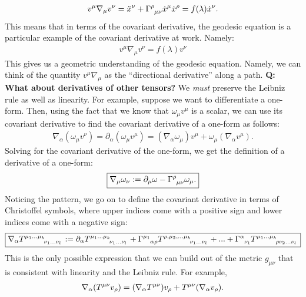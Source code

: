 \documentclass[11pt]{article}
\newcommand{\grmetric}[0]{g_{\mu \nu}}
\newcommand{\christoffel}[0]{\tensor{\Gamma}{^\rho_{\mu \nu}}}
\theoremstyle{definition}
\begin{document}
\begin{align*}
	v^\mu \nabla_\mu v^\nu = \ddot{x}^\nu + \christoffel \dot{x}^\mu \dot{x}^\rho = f (\lambda) \dot{x}^\nu. 
\end{align*}
This means that in terms of the covariant derivative, the geodesic equation is a particular example of the covariant derivative at work. Namely: 
\begin{align}\label{gechrist} 
	\boxed{v^\mu \nabla_\mu v^\nu = f(\lambda)v^\nu}
\end{align}
This gives us a geometric understanding of the geodesic equation. Namely, we can think of the quantity \( v^\mu \nabla_\mu \) as the ``directional derivative'' along a path. 
\newline
\newline
\textbf{Q: What about derivatives of other tensors?}
\newline
We \emph{must} preserve the Leibniz rule as well as linearity. For example, suppose we want to differentiate a one-form. Then,  using the fact that we know that \( \omega_\mu v^\mu \) is a scalar, we can use its covariant derivative to find the covariant derivative of a one-form as follows: 
\begin{align*}
	\nabla_\alpha ( \omega_\mu v^\nu ) = \partial_\alpha (\omega_\mu v^\mu ) = (\nabla_\alpha \omega_\mu ) v^\mu + \omega_\mu (\nabla_\alpha v^\mu).
\end{align*}
Solving for the covariant derivative of the one-form, we get the definition of a derivative of a one-form: 
\begin{align}
	\boxed{\nabla_\mu \omega_\nu := \partial_\mu \omega - \christoffel \omega_\mu. }
\end{align}
Noticing the pattern, we go on to define the covariant derivative in terms of Christoffel symbols, where upper indices come with a positive sign and lower indices come with a negative sign: 
\begin{align}\label{defn:covdevtensor}
	\boxed{\nabla_\alpha \tensor{T}{^{\mu_1 ... \mu_k}_{\nu_1 ... \nu_l}} :=  \partial_\alpha  \tensor{T}{^{\mu_1 ... \mu_k}_{\nu_1 ... \nu_l}} + \tensor{\Gamma}{^{\mu_1}_{\alpha \rho}}  \tensor{T}{^{\rho, \mu_2,  ... \mu_k}_{\nu_1 ... \nu_l}}  + ... + \tensor{\Gamma}{^\alpha _{\nu_1}}  \tensor{T}{^{\mu_1 ... \mu_k}_{\rho \nu_2 ... \nu_l}} }	
\end{align}
This is the only possible expression that we can build out of the metric \( \grmetric \) that is consistent with linearity and the Leibniz rule. For example, 
\begin{align*}
	\nabla_\alpha ( \tensor{T}{^{\mu \nu}} v_\rho) = ( \nabla_\alpha \tensor{T}{^{\mu \nu}}) v_\rho + \tensor{T}{^{\mu \nu}} ( \nabla_\alpha v_\rho ). 
\end{align*}
\end{document}
